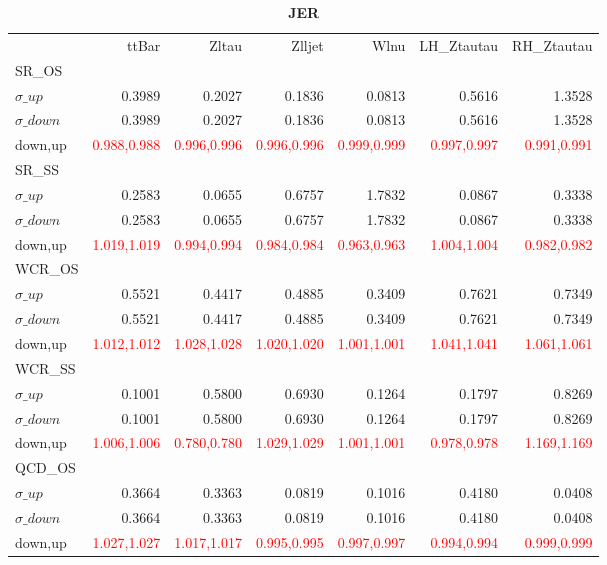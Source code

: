 \documentclass[11pt,oneside,a4paper]{article}
\begin{document}
\begin{table}
\centering
\caption{\bf{JER}}
\begin{tabular}{lrrrrrr}
 & ttBar & Zltau & Zlljet & Wlnu & LH\_Ztautau & RH\_Ztautau \\
SR\_OS &  &  &  &  &  &  \\
$\sigma\_up$ & 0.3989 & 0.2027 & 0.1836 & 0.0813 & 0.5616 & 1.3528 \\
$\sigma\_down$ & 0.3989 & 0.2027 & 0.1836 & 0.0813 & 0.5616 & 1.3528 \\
down,up & \textcolor{red}{0.988,0.988} & \textcolor{red}{0.996,0.996} & \textcolor{red}{0.996,0.996} & \textcolor{red}{0.999,0.999} & \textcolor{red}{0.997,0.997} & \textcolor{red}{0.991,0.991} \\

\hline
SR\_SS &  &  &  &  &  &  \\
$\sigma\_up$ & 0.2583 & 0.0655 & 0.6757 & 1.7832 & 0.0867 & 0.3338 \\
$\sigma\_down$ & 0.2583 & 0.0655 & 0.6757 & 1.7832 & 0.0867 & 0.3338 \\
down,up & \textcolor{red}{1.019,1.019} & \textcolor{red}{0.994,0.994} & \textcolor{red}{0.984,0.984} & \textcolor{red}{0.963,0.963} & \textcolor{red}{1.004,1.004} & \textcolor{red}{0.982,0.982} \\

\hline
WCR\_OS &  &  &  &  &  &  \\
$\sigma\_up$ & 0.5521 & 0.4417 & 0.4885 & 0.3409 & 0.7621 & 0.7349 \\
$\sigma\_down$ & 0.5521 & 0.4417 & 0.4885 & 0.3409 & 0.7621 & 0.7349 \\
down,up & \textcolor{red}{1.012,1.012} & \textcolor{red}{1.028,1.028} & \textcolor{red}{1.020,1.020} & \textcolor{red}{1.001,1.001} & \textcolor{red}{1.041,1.041} & \textcolor{red}{1.061,1.061} \\

\hline
WCR\_SS &  &  &  &  &  &  \\
$\sigma\_up$ & 0.1001 & 0.5800 & 0.6930 & 0.1264 & 0.1797 & 0.8269 \\
$\sigma\_down$ & 0.1001 & 0.5800 & 0.6930 & 0.1264 & 0.1797 & 0.8269 \\
down,up & \textcolor{red}{1.006,1.006} & \textcolor{red}{0.780,0.780} & \textcolor{red}{1.029,1.029} & \textcolor{red}{1.001,1.001} & \textcolor{red}{0.978,0.978} & \textcolor{red}{1.169,1.169} \\

\hline
QCD\_OS &  &  &  &  &  &  \\
$\sigma\_up$ & 0.3664 & 0.3363 & 0.0819 & 0.1016 & 0.4180 & 0.0408 \\
$\sigma\_down$ & 0.3664 & 0.3363 & 0.0819 & 0.1016 & 0.4180 & 0.0408 \\
down,up & \textcolor{red}{1.027,1.027} & \textcolor{red}{1.017,1.017} & \textcolor{red}{0.995,0.995} & \textcolor{red}{0.997,0.997} & \textcolor{red}{0.994,0.994} & \textcolor{red}{0.999,0.999} \\


\end{tabular}
\end{table}
\end{document}

